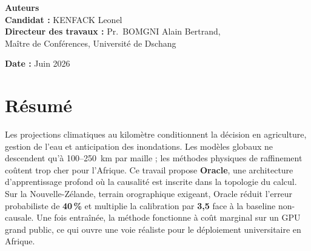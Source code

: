 \documentclass[14pt,a4paper]{extarticle}
\begin{document}
\vspace{2.5em}

\begin{center}
\end{center}

\vspace{3em}

\begin{center}
{\fontsize{15pt}{18pt}\selectfont\bfseries Auteurs}\\[1em]
{\fontsize{12pt}{14pt}\selectfont
\textbf{Candidat :} KENFACK Leonel\\[0.5em]
\textbf{Directeur des travaux :} Pr.~BOMGNI Alain Bertrand,\\
Maître de Conférences, Université de Dschang}
\end{center}

\vfill

\begin{center}
{\fontsize{12pt}{14pt}\selectfont\textbf{Date :} Juin 2026}
\end{center}

\endgroup
\newpage


\section*{Résumé}
Les projections climatiques au kilomètre conditionnent la décision en agriculture, gestion de l'eau et anticipation des inondations. Les modèles globaux ne descendent qu'à 100--250~km par maille ; les méthodes physiques de raffinement coûtent trop cher pour l'Afrique. Ce travail propose \textbf{Oracle}, une architecture d'apprentissage profond où la causalité est inscrite dans la topologie du calcul. Sur la Nouvelle-Zélande, terrain orographique exigeant, Oracle réduit l'erreur probabiliste de \textbf{40\,\%} et multiplie la calibration par \textbf{3,5} face à la baseline non-causale. Une fois entraînée, la méthode fonctionne à coût marginal sur un GPU grand public, ce qui ouvre une voie réaliste pour le déploiement universitaire en Afrique.
\end{document}
